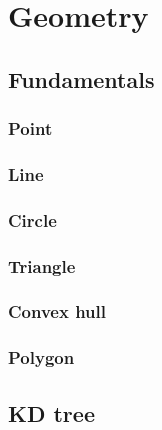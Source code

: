 \section{Geometry}

\subsection{Fundamentals}
\subsubsection{Point}

\subsubsection{Line}

\subsubsection{Circle}

\subsubsection{Triangle}

\subsubsection{Convex hull}

\subsubsection{Polygon}


\subsection{KD tree}

